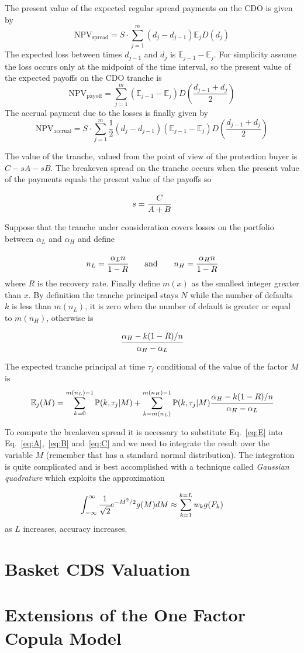 The present value of the expected regular spread payments on the CDO is given by
\begin{equation}
\mathrm{NPV}_{\mathrm{spread}} = S\cdot \sum_{j=1}^{m}(d_j - d_{j-1})\mathbb{E}_{j}D(d_j)
\label{eq:A}
\end{equation}
The expected loss between times $d_{j-1}$ and $d_j$ is $\mathbb{E}_{j-1}-\mathbb{E}_j$. For simplicity assume
the loss occurs only at the midpoint of the time interval, so the present value of the expected payoffs on the CDO tranche is
\begin{equation}
\mathrm{NPV}_{\mathrm{payoff}}=\sum_{j=1}^{m}(\mathbb{E}_{j-1}-\mathbb{E}_j)D\left(\frac{d_{j-1}+d_j}{2}\right)
\label{eq:C}
\end{equation}
The accrual payment due to the losses is finally given by
\begin{equation}
\mathrm{NPV}_{\mathrm{accrual}} = S\cdot\sum_{j=1}^{m}\frac{1}{2}(d_j - d_{j-1})(\mathbb{E}_{j-1}-\mathbb{E}_j)D(\frac{d_{j-1}+d_j}{2})
\label{eq:B}
\end{equation}

The value of the tranche, valued from the point of view of the protection buyer is $C-sA-sB$. The breakeven spread 
on the tranche occurs when the present value of the payments equals the present value of the payoffs so

\[ s = \cfrac{C}{A+B}\]

Suppose that the tranche under consideration covers losses on the portfolio between $\alpha_L$ and $\alpha_H$ and
define

\[n_L = \cfrac{\alpha_L n}{1-R}\qquad \mathrm{and}\qquad n_H = \cfrac{\alpha_H n}{1-R}\]
where $R$ is the recovery rate. Finally define $m(x)$ as the smallest integer greater than $x$.
By definition the tranche principal stays $N$ while the number of defaults $k$ is less than $m(n_L)$, it 
is zero when the number of default is greater or equal to $m(n_H)$, otherwise is

\[\cfrac{\alpha_H -k(1-R)/n}{\alpha_H - \alpha_L}\]

The expected tranche principal at time $\tau_j$ conditional of the value of the factor $M$ is
\begin{equation}
\mathbb{E}_j(M) = \sum_{k=0}^{m(n_L)-1}\mathbb{P}(k, \tau_j|M) + \sum_{k=m(n_L)}^{m(n_H)-1}\mathbb{P}(k, \tau_j|M) \cfrac{\alpha_H -k(1-R)/n}{\alpha_H - \alpha_L}
\label{eq:E}
\end{equation}

To compute the breakeven spread it is necessary to substitute Eq.~\ref{eq:E} into Eq.~\ref{eq:A},~\ref{eq:B} and~\ref{eq:C}
and we need to integrate the result over the variable $M$ (remember that has a standard normal distribution). 
The integration is quite complicated and is best accomplished with a technique called \emph{Gaussian quadrature} which
exploits the approximation

\[\int_{-\infty}^{\infty}{\cfrac{1}{\sqrt{2}}e^{-M^{2}/2}g(M)dM} \approx \sum_{k=1}^{k=L}w_k g(F_k)\]
as $L$ increases, accuracy increases.

\section{Basket CDS Valuation}

\section{Extensions of the One Factor Copula Model}

